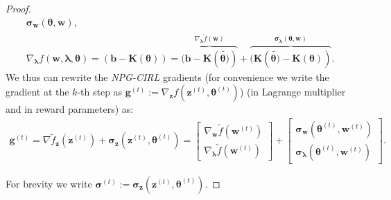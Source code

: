 \begin{proof}
\begin{align}
{        \bm{\sigma}_{\bm{w}}(\bm{\theta},\bm{w})
    } ,
    \\
    \label{eq:lambda_grad}
    \nabla_{\bm{\lambda}} f(\bm{w},\bm{\lambda},{\bm{\theta}}) =  (\bm{b}-\bm{K}(\bm{\theta})) =  \overbrace{(\bm{b}-\bm{K}(\tilde{\bm{\theta})}) }^{
        \nabla_{\bm{\lambda}} \tilde{f}(\bm{w})
    }+ \overbrace{(\bm{K}(\tilde{\bm{\theta})}-\bm{K}(\bm{\theta}))}^{
        \bm{\sigma}_{\bm{\lambda}}(\bm{\theta},\bm{w})
    }.
\end{align}
We thus can rewrite the \textit{NPG-CIRL} gradients (for convenience we write the gradient at the $k$-th step as $\bm{g}^{(t)}:=\nabla_{\bm{z}} f(\bm{z}^{(t)},\bm{\theta}^{(t)})$) (in Lagrange multiplier and in reward parameters) as:
\begin{align*}
    \bm{g}^{(t)} = \nabla \tilde{f}_{\bm{z}} (\bm{z}^{(t)}) + \bm{\sigma}_{\bm{z}}(\bm{z}^{(t)},\bm{\theta}^{(t)})
    = \begin{bmatrix}
        \nabla_{\bm{w}} \tilde{f}(\bm{w}^{(t)}) \\
        \nabla_{\bm{\lambda}} \tilde{f}(\bm{w}^{(t)})
    \end{bmatrix}
    + \begin{bmatrix}
        \bm{\sigma}_{\bm{w}}(\bm{\theta}^{(t)},\bm{w}^{(t)}) \\
        \bm{\sigma}_{\bm{\lambda}}(\bm{\theta}^{(t)},\bm{w}^{(t)})
    \end{bmatrix}.
\end{align*}

For brevity we write $\bm{\sigma}^{(t)} := \bm{\sigma}_{\bm{z}}(\bm{z}^{(t)},\bm{\theta}^{(t)})$. 


\end{proof}
